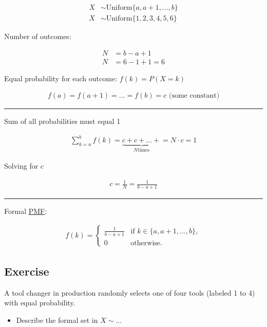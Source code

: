 \documentclass[
  a4paper,
]{scrbook}
\providecommand{\tightlist}{%
  \setlength{\itemsep}{0pt}\setlength{\parskip}{0pt}}\usepackage{longtable,booktabs,array}
\begin{document}
\begin{align}
X &\sim \mathrm{Uniform}\{a,a+1, ..., b\} \\
X &\sim \mathrm{Uniform}\{1,2,3,4,5,6\}
\end{align}

Number of outcomes:

\begin{align}
N &= b-a+1\\
N &= 6-1+1=6
\end{align}

Equal probability for each outcome: \(f(k) = P (X = k)\)

\begin{align}
f(a) = f(a+1)= ... = f(b) = c \text{ (some constant)}
\end{align}

\begin{center}\rule{0.5\linewidth}{0.5pt}\end{center}

Sum of all probabilities must equal 1

\begin{align}
\sum_{k = a}^b f(k) = \underbrace{c+c+ ... +}_{N\text{times}} = N \cdot c = 1
\end{align}

Solving for \(c\)

\begin{align}
c = \frac{1}{N} = \frac{1}{b-a+1}
\end{align}

\begin{center}\rule{0.5\linewidth}{0.5pt}\end{center}

Formal \hyperref[acronyms_PMF]{PMF}:

\begin{align}
f(k) = \begin{cases}
\frac{1}{b - a + 1} & \text{if } k \in \{a, a+1, \dots, b\}, \\
0 & \text{otherwise.}
\end{cases}
\end{align}

\subsection{Exercise}\label{exercise}

A tool changer in production randomly selects one of four tools (labeled
1 to 4) with equal probability.

\begin{itemize}
\tightlist
\item
  Describe the formal set in \(X \sim ...\)
\end{itemize}
\end{document}

